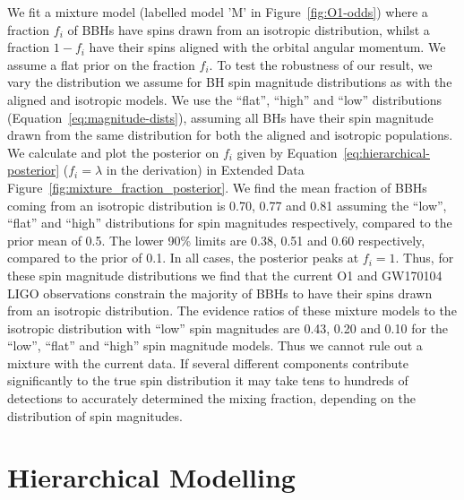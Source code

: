 \documentclass{nature}
\begin{document}
\begin{methods}
We fit a mixture model\cite{Stevenson:2017spin} (labelled model 'M' in
Figure~\ref{fig:O1-odds}) where a fraction $f_i$ of BBHs have spins
drawn from an isotropic distribution, whilst a fraction $1 - f_i$ have
their spins aligned with the orbital angular momentum. We assume a
flat prior on the fraction $f_i$. To test the robustness of our
result, we vary the distribution we assume for BH spin magnitude
distributions as with the aligned and isotropic models. We use the
``flat'', ``high'' and ``low'' distributions
(Equation~\ref{eq:magnitude-dists}), assuming all BHs have their spin
magnitude drawn from the same distribution for both the aligned and
isotropic populations. We calculate and plot the posterior on $f_i$
given by Equation~\ref{eq:hierarchical-posterior} ($f_i=\lambda$ in
the derivation) in Extended Data
Figure~\ref{fig:mixture_fraction_posterior}. We find the mean fraction
of BBHs coming from an isotropic distribution is 0.70, 0.77 and 0.81
assuming the ``low'', ``flat'' and ``high'' distributions for spin
magnitudes respectively, compared to the prior mean of 0.5. The lower
90\% limits are 0.38, 0.51 and 0.60 respectively, compared to the
prior of 0.1. In all cases, the posterior peaks at $f_i = 1$. Thus,
for these spin magnitude distributions we find that the current O1 and
GW170104 LIGO observations constrain the majority of BBHs to have
their spins drawn from an isotropic distribution. The evidence ratios
of these mixture models to the isotropic distribution with ``low''
spin magnitudes are 0.43, 0.20 and 0.10 for the ``low'', ``flat'' and
``high'' spin magnitude models. Thus we cannot rule out a mixture with
the current data.  If several different components contribute
significantly to the true spin distribution it may take tens to
hundreds of detections to accurately determined the mixing fraction,
depending on the distribution of spin
magnitudes\cite{2017CQGra..34cLT01V,Stevenson:2017spin}.

\section{Hierarchical Modelling} 
\label{sec:hierarchical}


\end{methods}
\end{document}
